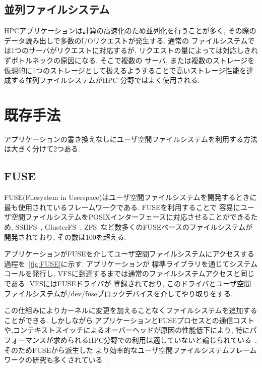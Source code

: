 \documentclass[a4paper,11pt]{jreport}
\begin{document}
\section{並列ファイルシステム}
HPCアプリケーションは計算の高速化のため並列化を行うことが多く, その際のデータ読み出しで多数のI/Oリクエストが発生する. 通常の
ファイルシステムでは1つのサーバがリクエストに対応するが, リクエストの量によっては対応しきれずボトルネックの原因になる. そこで複数の
サーバ, または複数のストレージを仮想的に1つのストレージとして扱えるようすることで高いストレージ性能を達成する並列ファイルシステムがHPC
分野ではよく使用される. 


\chapter{既存手法}
アプリケーションの書き換えなしにユーザ空間ファイルシステムを利用する方法は大きく分けて2つある.
\section{FUSE}
FUSE(Filesystem in Userspace)はユーザ空間ファイルシステムを開発するときに最も使用されているフレームワークである. FUSEを利用することで
容易にユーザ空間ファイルシステムをPOSIXインターフェースに対応させることができるため, SSHFS~\cite{hoskins2006sshfs}, GlusterFS~\cite{davies2013scale}, 
ZFS~\cite{rodeh2003zfs}など数多くのFUSEベースのファイルシステムが開発されており, その数は100を超える.

アプリケーションがFUSEを介してユーザ空間ファイルシステムにアクセスする過程を\figurename~\ref{fig:FUSE}に示す. アプリケーションが
標準ライブラリを通じてシステムコールを発行し, VFSに到達するまでは通常のファイルシステムアクセスと同じである. VFSにはFUSEドライバが
登録されており, このドライバとユーザ空間ファイルシステムが/dev/fuseブロックデバイスを介してやり取りをする.

この仕組みによりカーネルに変更を加えることなくファイルシステムを追加することができる. 
しかしながら,アプリケーションとFUSEプロセスとの通信コストや,コンテキストスイッチによるオーバーヘッドが原因の性能低下により, 
特にパフォーマンスが求められるHPC分野での利用は適していないと論じられている~\cite{brinkmann2020ad}. そのためFUSEから派生した
より効率的なユーザ空間ファイルシステムフレームワークの研究も多くされている~\cite{294791, zhu2018direct, 3494556}. 

\newpage
\end{document}
